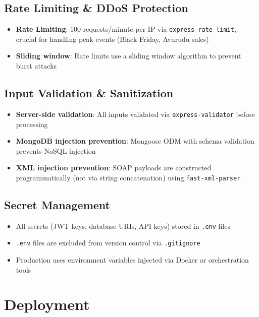 \documentclass[12pt,a4paper]{article}
\begin{document}
\subsection{Rate Limiting \& DDoS Protection}

\begin{itemize}
  \item \textbf{Rate Limiting}: 100 requests/minute per IP via \texttt{express-rate-limit}, crucial for handling peak events (Black Friday, Avurudu sales)
  \item \textbf{Sliding window}: Rate limits use a sliding window algorithm to prevent burst attacks
\end{itemize}

\subsection{Input Validation \& Sanitization}

\begin{itemize}
  \item \textbf{Server-side validation}: All inputs validated via \texttt{express-validator} before processing
  \item \textbf{MongoDB injection prevention}: Mongoose ODM with schema validation prevents NoSQL injection
  \item \textbf{XML injection prevention}: SOAP payloads are constructed programmatically (not via string concatenation) using \texttt{fast-xml-parser}
\end{itemize}

\subsection{Secret Management}

\begin{itemize}
  \item All secrets (JWT keys, database URIs, API keys) stored in \texttt{.env} files
  \item \texttt{.env} files are excluded from version control via \texttt{.gitignore}
  \item Production uses environment variables injected via Docker or orchestration tools
\end{itemize}

\section{Deployment}
\end{document}
